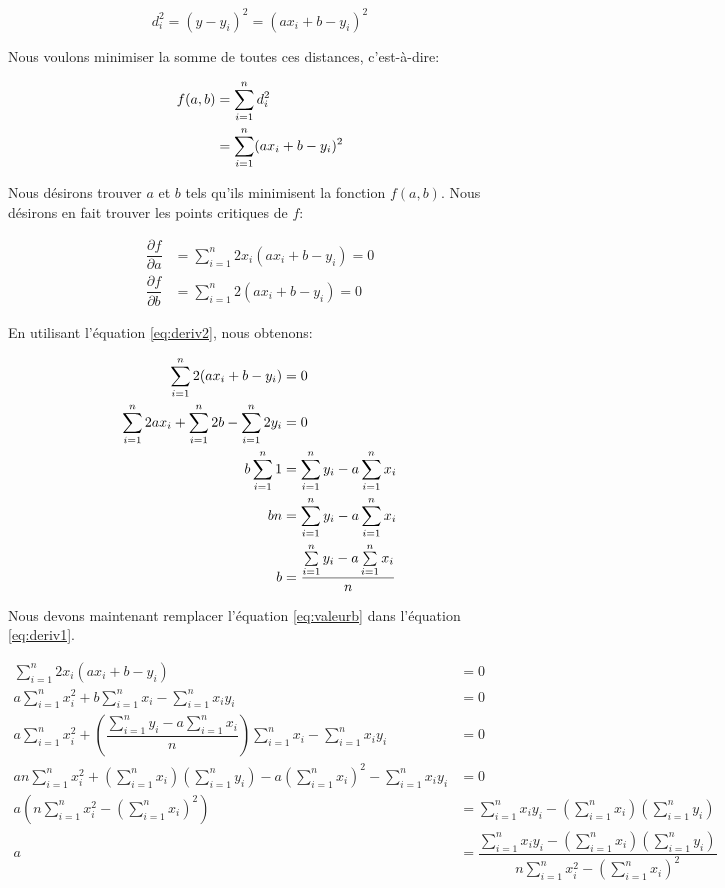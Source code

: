 \documentclass[]{book}
\theoremstyle{definition}
\theoremstyle{definition}
\theoremstyle{definition}
\theoremstyle{remark}
\begin{document}
\[ d_i^2 = (y-y_i)^2 = (ax_i+b-y_i)^2 \]

Nous voulons minimiser la somme de toutes ces distances, c'est-à-dire:

\begin{equation}
\begin{split}
f(a,b) &= \sum_{i=1}^n d_i^2 \notag \\
&= \sum_{i=1}^n (ax_i+b-y_i)^2
\end{split}
\label{eq:somme-distances}
\end{equation}

Nous désirons trouver \(a\) et \(b\) tels qu'ils minimisent la fonction
\(f(a,b)\). Nous désirons en fait trouver les points critiques de \(f\):

\begin{align}
\dfrac{\partial f}{\partial a} &= \sum_{i=1}^n 2x_i(ax_i+b-y_i) = 0 \label{eq:deriv1}\\
\dfrac{\partial f}{\partial b} &= \sum_{i=1}^n 2(ax_i+b-y_i) = 0 \label{eq:deriv2}
\end{align}

En utilisant l'équation \eqref{eq:deriv2}, nous obtenons:

\begin{align}
\sum_{i=1}^n 2(ax_i+b-y_i) &= 0 \notag\\
\sum_{i=1}^n 2ax_i + \sum_{i=1}^n 2b - \sum_{i=1}^n 2y_i &= 0 \notag\\
b \sum_{i=1}^n 1 &= \sum_{i=1}^n y_i - a \sum_{i=1}^n x_i \notag\\
bn &= \sum_{i=1}^n y_i - a \sum_{i=1}^n x_i \notag\\
b &= \dfrac{\sum\limits_{i=1}^n y_i - a \sum\limits_{i=1}^n x_i}{n} \label{eq:valeurb}
\end{align}

Nous devons maintenant remplacer l'équation \eqref{eq:valeurb} dans
l'équation \eqref{eq:deriv1}.

\begin{align*}
\sum_{i=1}^n 2x_i(ax_i+b-y_i) &= 0 \\
a\sum_{i=1}^n x_i^2 + b \sum_{i=1}^n x_i - \sum_{i=1}^n x_iy_i &= 0 \\
a\sum_{i=1}^n x_i^2 + \left(\dfrac{\sum\limits_{i=1}^n y_i - a \sum\limits_{i=1}^n x_i}{n}\right) \sum_{i=1}^n x_i - \sum_{i=1}^n x_iy_i &= 0 \\
an\sum_{i=1}^n x_i^2+\left(\sum_{i=1}^n x_i\right)\left(\sum_{i=1}^n y_i\right)-a\left(\sum_{i=1}^n x_i\right)^2- \sum_{i=1}^n x_iy_i &= 0 \\
a\left(n\sum_{i=1}^n x_i^2-\left(\sum_{i=1}^n x_i\right)^2\right) &= \sum_{i=1}^n x_iy_i-\left(\sum_{i=1}^n x_i\right)\left(\sum_{i=1}^n y_i\right) \\
a &= \dfrac{\sum\limits_{i=1}^n x_iy_i-\left(\sum\limits_{i=1}^n x_i\right)\left(\sum\limits_{i=1}^n y_i\right)}{n\sum\limits_{i=1}^n x_i^2-\left(\sum\limits_{i=1}^n x_i\right)^2}
\end{align*}
\end{document}
